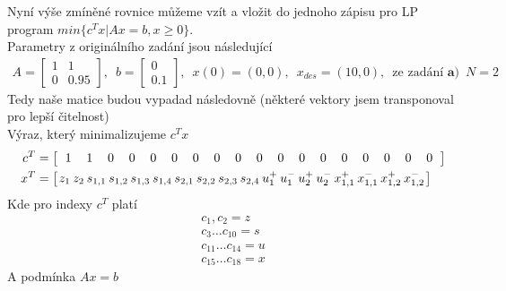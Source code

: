 \documentclass[12pt]{article}
\begin{document}
    Nyní výše zmíněné rovnice můžeme vzít a vložit do jednoho zápisu pro LP program $min\{c^T x| Ax = b, x \geq 0\}$. \\
    Parametry z originálního zadání jsou následující
    \begin{align*}
        A = \begin{bmatrix}
                1 & 1\\
                0 & 0.95
        \end{bmatrix}, \enspace
        b = \begin{bmatrix}
                0 \\
                0.1
        \end{bmatrix}, \enspace
        x(0) = (0,0), \enspace
        x_{des} = (10,0), \enspace
        \text{ze zadání } \bm{a)} \enspace N = 2
    \end{align*}
    Tedy naše matice budou vypadad následovně (některé vektory jsem transponoval pro lepší čitelnost) \\
    Výraz, který minimalizujeme $c^T x$
    \begin{align*}
        c^T &=
        \left[\setlength\arraycolsep{6pt}
        \begin{array}{*{18}{c}}
            1 & 1 & 0 & 0 & 0 & 0 & 0 & 0 & 0 & 0 & 0 & 0 & 0 & 0 & 0 & 0 & 0 & 0
        \end{array}
        \right] \\
        x^T &= \left[\setlength\arraycolsep{1pt}
        \begin{array}{*{18}{c}}
            z_1 &z_2 &s_{1,1} &s_{1,2} &s_{1,3} &s_{1,4} &s_{2,1} &s_{2,2} &s_{2,3} &s_{2,4} &u_{1}^+ &u_{1}^-
            &u_{2}^+ &u_{2}^- &x_{1,1}^+ &x_{1,1}^- &x_{1,2}^+ &x_{1,2}^-
        \end{array}
        \right]
    \end{align*}
    Kde pro indexy $c^T$ platí
    \begin{align*}
        c_1, c_2 = z\\
        c_3 \dots c_{10} = s \\
        c_{11} \dots c_{14} = u \\
        c_{15} \dots c_{18} = x
    \end{align*}
    A podmínka $Ax = b$
\end{document}

